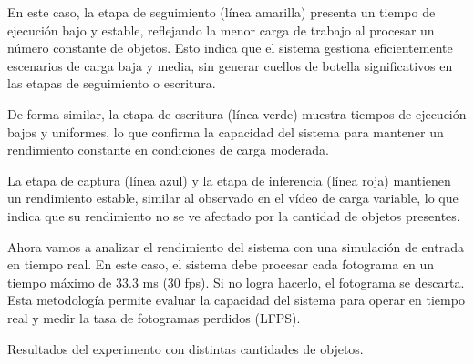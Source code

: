\documentclass[11pt,spanish,listoffigures,listoftables]{tfgetsinf}
\begin{document}
En este caso, la etapa de seguimiento (línea amarilla) presenta un tiempo de ejecución bajo y estable, reflejando la menor carga de trabajo al procesar un número constante de objetos. Esto indica que el sistema gestiona eficientemente escenarios de carga baja y media, sin generar cuellos de botella significativos en las etapas de seguimiento o escritura.

De forma similar, la etapa de escritura (línea verde) muestra tiempos de ejecución bajos y uniformes, lo que confirma la capacidad del sistema para mantener un rendimiento constante en condiciones de carga moderada.

La etapa de captura (línea azul) y la etapa de inferencia (línea roja) mantienen un rendimiento estable, similar al observado en el vídeo de carga variable, lo que indica que su rendimiento no se ve afectado por la cantidad de objetos presentes.



Ahora vamos a analizar el rendimiento del sistema con una simulación de entrada en tiempo real. En este caso, el sistema debe procesar cada fotograma en un tiempo máximo de 33.3 ms (30 fps). Si no logra hacerlo, el fotograma se descarta. Esta metodología permite evaluar la capacidad del sistema para operar en tiempo real y medir la tasa de fotogramas perdidos (LFPS).

\begin{table}[H]
   \centering
   \caption{Resultados del experimento con distintas cantidades de objetos.}
   \label{tab:experimento_objetos}
\end{table}
\end{document}
